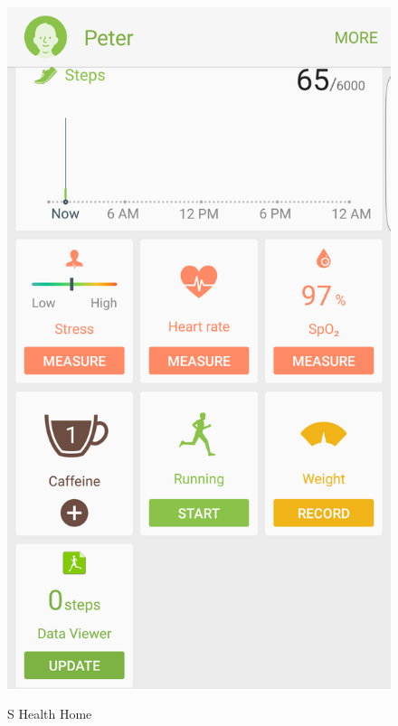 \documentclass[a4paper,10pt]{article}
\begin{document}
\begin{figure}[H]
	\centering
	\begin{minipage}{0.45\textwidth}
		\centering
		\includegraphics[scale = 0.07]{sHealthHome.png}
		\label{sHealthHome}
		\caption{S Health Home}
	\end{minipage}\hfill
	\begin{minipage}{0.45\textwidth}
		\centering

\end{minipage}
\end{figure}
\end{document}
